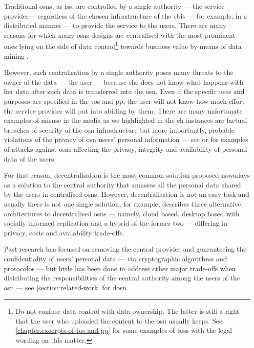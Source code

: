 \documentclass[showtrims,oldfontcommands]{kthesis}
\makeatletter
\newcommand\firstToLow[1]{%
 {%
   \renewcommand{\mfirstucMakeUppercase}{\MakeLowercase}%
   \makefirstuc{#1}%
 }%
}
\newcommand*{\lcnameref}[1]{%
 \begingroup 
   \let\label\@gobble
   \NR@setref{#1}\lc@thirdoffive{#1}%
  \endgroup
}
\newcommand{\lc@thirdoffive}[5]{\firstToLow{#3}}
\makeatother
\begin{document}
Traditional \acp{osn}, as \acp{is}, are controlled by a single authority --- the 
service provider--- regardless of the chosen infrastructure of the \ac{cbis} --- 
for example, in a distributed manner --- to provide the service to the users. There 
are many reasons for which many \acp{osn} designs are centralised with the most 
prominent ones lying on the side of data control\footnote{Do not confuse data control 
with data ownership. The latter is still a right that the user who uploaded the content 
to the \ac{osn} usually keeps. See \cref{chapter:excerpts-of-tos-and-pp} for some 
examples of \acp{tos} with the legal wording on this matter.} towards business value 
by means of data mining \cite{DomingosR01}.

However, such centralisation by a single authority poses many threats to the owner 
of the data --- the user --- because she does not know what happens with her data 
after such data is transferred into the \ac{osn}. Even if the specific uses and 
purposes are specified in the \ac{tos} and \ac{pp}, the user will not know how much 
effort the service provider will put into abiding by them. There are many unfortunate 
examples of misuse in the media as we highlighted in the \lcnameref{chapter:introduction}.
Such instances are factual breaches of security of the \ac{osn} infrastructure but 
more importantly, probable violations of the privacy of \ac{osn} users' personal 
information --- see \cite{CutilloMS10} or \cite{GaoHHWC11} for examples of attacks 
against \acp{osn} affecting the privacy, integrity and availability of personal 
data of the users.

For that reason, decentralisation is the most common solution proposed nowadays 
as a solution to the central authority that amasses all the personal data shared 
by the users in centralised \acp{osn}. However, decentralisation is not an easy 
task and usually there is not one single solution, for example, \cite{ShakimovVCC09} 
describes three alternative architectures to decentralised \acp{osn} --- namely, 
cloud based, desktop based with socially informed replication and a hybrid of the 
former two --- differing in privacy, costs and availability trade-offs. 

Past research has focused on removing the central provider and guaranteeing the 
confidentiality of users' personal data --- via cryptographic algorithms and protocolos 
--- but little has been done to address other major trade-offs when distributing 
the responsibilities of the central authority among the users of the \ac{osn} \cite{GreschbachKB12} 
--- see \cref{section:related-work} for \lcnameref{section:related-work} on \acp{dosn}.
\end{document}
